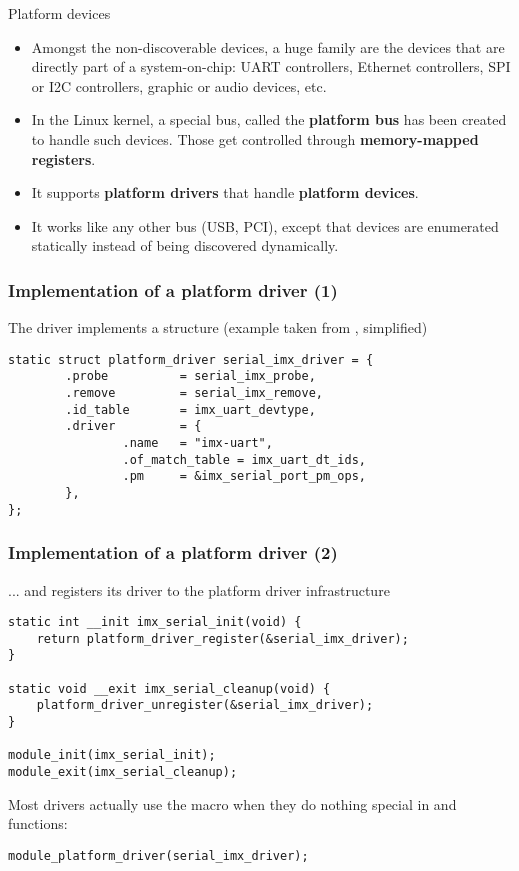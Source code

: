 \begin{frame}{Platform devices}
  \begin{itemize}
  \item Amongst the non-discoverable devices, a huge family are the
    devices that are directly part of a system-on-chip: UART
    controllers, Ethernet controllers, SPI or I2C controllers, graphic
    or audio devices, etc.
  \item In the Linux kernel, a special bus, called the {\bf platform
      bus} has been created to handle such devices. Those get controlled
      through {\bf memory-mapped registers}.
  \item It supports {\bf platform drivers} that handle {\bf platform
      devices}.
  \item It works like any other bus (USB, PCI), except that devices
    are enumerated statically instead of being discovered dynamically.
  \end{itemize}
\end{frame}

\begin{frame}[fragile]
  \frametitle{Implementation of a platform driver (1)}
  The driver implements a 
  structure (example taken from ,
  simplified)
  \begin{block}{}
  \begin{verbatim}
static struct platform_driver serial_imx_driver = {
        .probe          = serial_imx_probe,
        .remove         = serial_imx_remove,
        .id_table       = imx_uart_devtype,
        .driver         = {
                .name   = "imx-uart",
                .of_match_table = imx_uart_dt_ids,
                .pm     = &imx_serial_port_pm_ops,
        },
};
\end{verbatim}
\end{block}
\end{frame}


\begin{frame}[fragile]
  \frametitle{Implementation of a platform driver (2)}
  ... and registers its driver to the platform driver infrastructure
  \begin{block}{}
  \begin{verbatim}
static int __init imx_serial_init(void) {
    return platform_driver_register(&serial_imx_driver);
}

static void __exit imx_serial_cleanup(void) {
    platform_driver_unregister(&serial_imx_driver);
}

module_init(imx_serial_init);
module_exit(imx_serial_cleanup);
  \end{verbatim}
\end{block}
Most drivers actually use the 
macro when they do nothing special in  and  functions:
  \begin{block}{}
  \begin{verbatim}
module_platform_driver(serial_imx_driver);
  \end{verbatim}
\end{block}
\end{frame}

